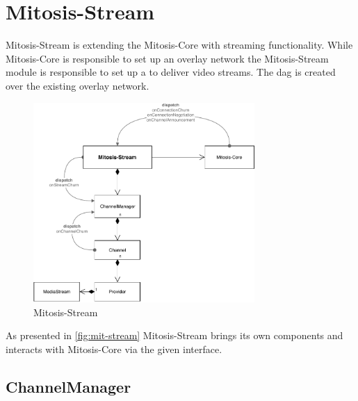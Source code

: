 \section{Mitosis-Stream}
Mitosis-Stream is extending the Mitosis-Core with streaming functionality. While Mitosis-Core is responsible to set up an overlay network the Mitosis-Stream module is responsible to set up a  to deliver video streams. The \gls{dag} is created over the existing overlay network.

\begin{figure}
\centering
\includegraphics[width=0.75\textwidth]{graphics/implementation/mitosis-architecture-mitosis-stream.pdf}
\caption{Mitosis-Stream}
\label{fig:mit-stream}
\end{figure}

As presented in \vref{fig:mit-stream} Mitosis-Stream brings its own components and interacts with Mitosis-Core via the given interface. 

\subsection{ChannelManager}
